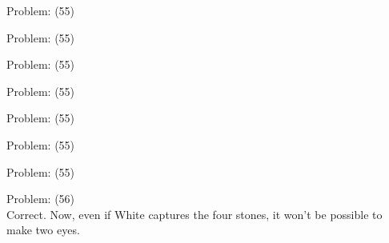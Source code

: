 \documentclass[11pt]{article}
\begin{document}
\begin{minipage}[t]{0.5\textwidth}
  {\centering
  
Problem: (55)\\
  }
\end{minipage}
\begin{minipage}[t]{0.5\textwidth}
  {\centering
  
Problem: (55)\\
  }
\end{minipage}
\begin{minipage}[t]{0.5\textwidth}
  {\centering
  
Problem: (55)\\
  }
\end{minipage}
\begin{minipage}[t]{0.5\textwidth}
  {\centering
  
Problem: (55)\\
  }
\end{minipage}
\begin{minipage}[t]{0.5\textwidth}
  {\centering
  
Problem: (55)\\
  }
\end{minipage}
\begin{minipage}[t]{0.5\textwidth}
  {\centering
  
Problem: (55)\\
  }
\end{minipage}
\begin{minipage}[t]{0.5\textwidth}
  {\centering
  
Problem: (55)\\
  }
\end{minipage}
\begin{minipage}[t]{0.5\textwidth}
  {\centering
  
Problem: (56)\\
Correct. Now, even if White captures the four stones, it won't be possible to make two eyes.\\
  }
\end{minipage}
\end{document}
